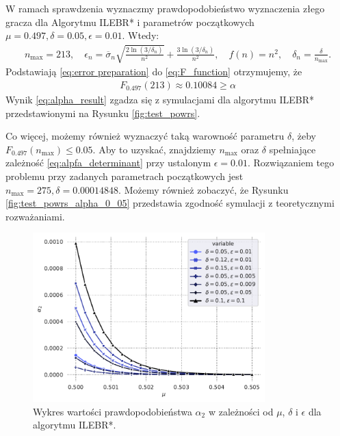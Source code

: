 \documentclass[inzynierska]{pwr_wmat_praca_dyplomowa}
\theoremstyle{plain}
\numberwithin{theorem}{chapter}
\theoremstyle{definition}
\numberwithin{theorem}{chapter}
\newcommand{\nmax}{n_{\text{max}}}
\begin{document}
	W ramach sprawdzenia wyznaczmy prawdopodobieństwo wyznaczenia złego gracza dla Algorytmu ILEBR* i parametrów początkowych $\mu = 0.497, \delta=0.05, \epsilon=0.01$.
	Wtedy:
	\begin{gather}
		\label{eq:error preparation}
		\nmax = 213,\quad
		 \epsilon_n = \overline{\sigma}_n \sqrt{\frac{2\ln(3/\delta_n)}{n^2}} + \frac{3  \ln{(3 / \delta_n)}}{n^2},\quad
		  f(n) = n^2,\quad 
		  \delta_n = \frac{\delta}{\nmax}.
	\end{gather}
	Podstawiają \eqref{eq:error preparation} do \eqref{eq:F_function} otrzymujemy, że
	\begin{gather}
		\label{eq:alpha_result}
		F_{0.497}(213)  \approx 0.10084 \ge \alpha
	\end{gather}
	Wynik \eqref{eq:alpha_result} zgadza się z symulacjami dla algorytmu ILEBR* przedstawionymi na Rysunku \ref{fig:test_powrs}.
	
	Co więcej, możemy również wyznaczyć taką warowność parametru $\delta$, żeby $F_{0.497}(\nmax) \le 0.05$. Aby to uzyskać, znajdziemy $\nmax$ oraz $\delta$ spełniające zależność \eqref{eq:alpfa_determinant} przy ustalonym $\epsilon = 0.01$.
	Rozwiązaniem tego problemu przy zadanych parametrach początkowych jest $\nmax = 275, \delta = 0.00014848$. Możemy również zobaczyć, że Rysunku \ref{fig:test_powrs_alpha_0_05} przedstawia zgodność symulacji z teoretycznymi rozważaniami.
	\begin{figure}
		\centering
		\includegraphics[width=0.8\textwidth]{imagens/alpha_2.pdf}
		\caption{Wykres wartości prawdopodobieństwa $\alpha_2$ w zależności od $\mu$, $\delta$ i $\epsilon$ dla algorytmu ILEBR*.}
		\label{fig:a2_probability}
	\end{figure}
\end{document}
